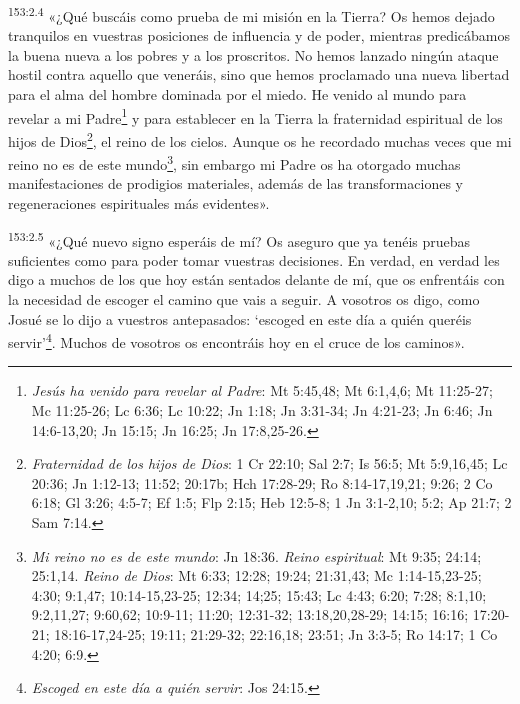 \par
\textsuperscript{153:2.4} «¿Qué buscáis como prueba de mi misión en la Tierra? Os hemos dejado tranquilos en vuestras posiciones de influencia y de poder, mientras predicábamos la buena nueva a los pobres y a los proscritos. No hemos lanzado ningún ataque hostil contra aquello que veneráis, sino que hemos proclamado una nueva libertad para el alma del hombre dominada por el miedo. He venido al mundo para revelar a mi Padre\footnote{\textit{Jesús ha venido para revelar al Padre}: Mt 5:45,48; Mt 6:1,4,6; Mt 11:25-27; Mc 11:25-26; Lc 6:36; Lc 10:22; Jn 1:18; Jn 3:31-34; Jn 4:21-23; Jn 6:46; Jn 14:6-13,20; Jn 15:15; Jn 16:25; Jn 17:8,25-26.} y para establecer en la Tierra la fraternidad espiritual de los hijos de Dios\footnote{\textit{Fraternidad de los hijos de Dios}: 1 Cr 22:10; Sal 2:7; Is 56:5; Mt 5:9,16,45; Lc 20:36; Jn 1:12-13; 11:52; 20:17b; Hch 17:28-29; Ro 8:14-17,19,21; 9:26; 2 Co 6:18; Gl 3:26; 4:5-7; Ef 1:5; Flp 2:15; Heb 12:5-8; 1 Jn 3:1-2,10; 5:2; Ap 21:7; 2 Sam 7:14.}, el reino de los cielos. Aunque os he recordado muchas veces que mi reino no es de este mundo\footnote{\textit{Mi reino no es de este mundo}: Jn 18:36. \textit{Reino espiritual}: Mt 9:35; 24:14; 25:1,14. \textit{Reino de Dios}: Mt 6:33; 12:28; 19:24; 21:31,43; Mc 1:14-15,23-25; 4:30; 9:1,47; 10:14-15,23-25; 12:34; 14;25; 15:43; Lc 4:43; 6:20; 7:28; 8:1,10; 9:2,11,27; 9:60,62; 10:9-11; 11:20; 12:31-32; 13:18,20,28-29; 14:15; 16:16; 17:20-21; 18:16-17,24-25; 19:11; 21:29-32; 22:16,18; 23:51; Jn 3:3-5; Ro 14:17; 1 Co 4:20; 6:9.}, sin embargo mi Padre os ha otorgado muchas manifestaciones de prodigios materiales, además de las transformaciones y regeneraciones espirituales más evidentes».

\par
\textsuperscript{153:2.5} «¿Qué nuevo signo esperáis de mí? Os aseguro que ya tenéis pruebas suficientes como para poder tomar vuestras decisiones. En verdad, en verdad les digo a muchos de los que hoy están sentados delante de mí, que os enfrentáis con la necesidad de escoger el camino que vais a seguir. A vosotros os digo, como Josué se lo dijo a vuestros antepasados: `escoged en este día a quién queréis servir'\footnote{\textit{Escoged en este día a quién servir}: Jos 24:15.}. Muchos de vosotros os encontráis hoy en el cruce de los caminos».

